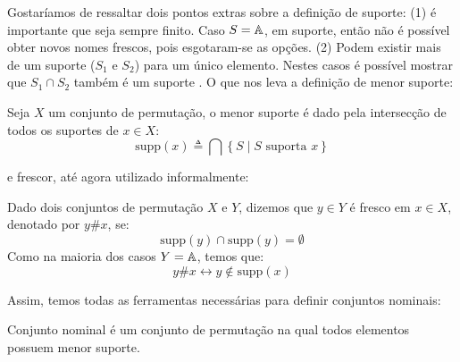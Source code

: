 Gostaríamos de ressaltar dois pontos extras sobre a definição de suporte: (1) é importante que seja sempre finito. Caso $S = \mathbb{A}$, em suporte, então não é possível obter novos nomes frescos, pois esgotaram-se as opções.
(2) Podem existir mais de um suporte ($S_1$ e $S_2$) para um único elemento. Nestes casos é possível mostrar que $S_1 \cap S_2$ também é um suporte \cite[Proposição 2.3]{Pitts2013}. O que nos leva a definição de menor suporte:
\begin{definicao}
	Seja $X$ um conjunto de permutação, o menor suporte é dado pela intersecção de todos os suportes de $x \in X$:
	\begin{equation}\label{eq:menor-suporte}
		\text{supp}(x) \triangleq \bigcap \left\{ S \mid S \text{ suporta } x \right\}
	\end{equation}	
\end{definicao}\noindent
e frescor, até agora utilizado informalmente:
\begin{definicao}[Frescor]
	Dado dois conjuntos de permutação $X$ e $Y$, dizemos que $y \in Y$ é fresco em $x \in X$, denotado por $y \# x$, se:
	\begin{equation}\label{eq:frescor-supp}
		\text{supp}(y) \cap \text{supp}(y) = \emptyset
	\end{equation}
	Como na maioria dos casos $Y = \mathbb{A}$, temos que:
	\begin{equation}\label{eq:frescor}
		y \# x \leftrightarrow y \notin \text{supp}(x)
	\end{equation}
\end{definicao}\noindent
Assim, temos todas as ferramentas necessárias para definir conjuntos nominais:
\begin{definicao}
	Conjunto nominal é um conjunto de permutação na qual todos elementos possuem menor suporte.
\end{definicao}

